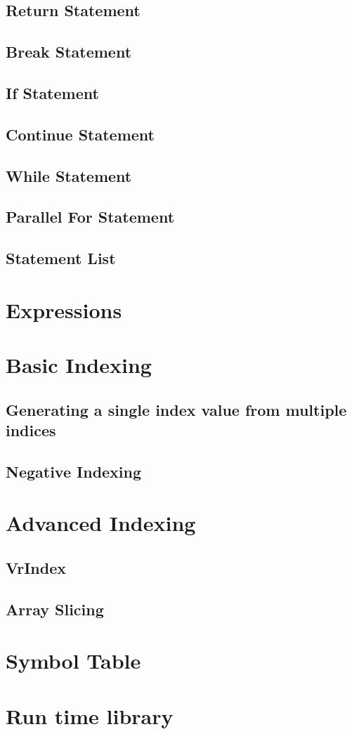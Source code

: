 \subsection{Return Statement}
\subsection{Break Statement}
\subsection{If Statement}
\subsection{Continue Statement}
\subsection{While Statement}
\subsection{Parallel For Statement}
\subsection{Statement List}
\section{Expressions}
\section{Basic Indexing}
\label{sec:indexing}
\subsection{ Generating a single index value from multiple indices}
\subsection{Negative Indexing}
\section{Advanced Indexing}
\subsection{VrIndex}
\label{subsec:vrindex}
\subsection{Array Slicing}
\section{Symbol Table}
\section{Run time library}
